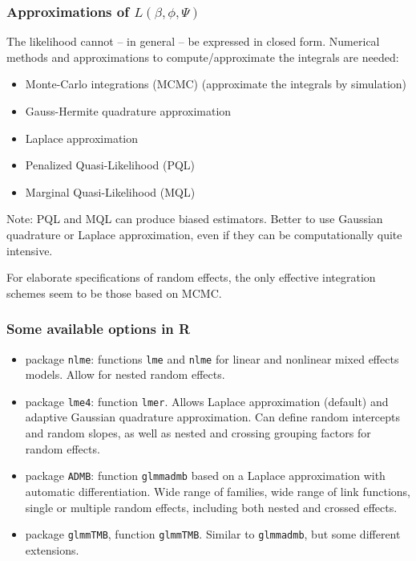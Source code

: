 \documentclass{beamer}
\newcommand{\bs}{\bigskip}
\begin{document}
\begin{frame}
\frametitle{Approximations of $L(\beta,\phi, \Psi)$}

The likelihood cannot -- in general -- be expressed in closed form.
Numerical methods and approximations to compute/approximate the integrals are needed:
\begin{itemize}
\item Monte-Carlo integrations (MCMC) (approximate the integrals by simulation)
\item Gauss-Hermite quadrature approximation
\item Laplace approximation
\item Penalized Quasi-Likelihood (PQL)
\item Marginal Quasi-Likelihood (MQL)
\end{itemize}

\bs
Note: PQL and MQL can produce biased estimators. Better to use Gaussian
quadrature or Laplace approximation, even if they can be computationally quite
intensive. 

\bs
For elaborate specifications of random effects, the only effective
integration schemes seem to be those based on MCMC.

\end{frame}

\begin{frame}
\frametitle{Some available options in R}

\begin{itemize}
\item package \texttt{nlme}: functions \texttt{lme} and  \texttt{nlme}
  for  linear and nonlinear mixed effects models. Allow for nested
  random effects. 
\item package \texttt{lme4}: function \texttt{lmer}. Allows Laplace approximation (default) and adaptive
Gaussian quadrature approximation. Can define random
intercepts and random slopes, as well as nested and crossing grouping
factors for random effects. 
\item package \texttt{ADMB}: function \texttt{glmmadmb} based on a Laplace
approximation with automatic differentiation. Wide range of families,
wide range of link functions, single or multiple random effects, including both
nested and crossed effects.
\item package \texttt{glmmTMB}, function \texttt{glmmTMB}. Similar to \texttt{glmmadmb}, but some different extensions.
\end{itemize}

\end{frame}
\end{document}
